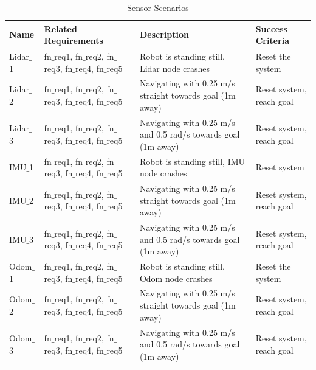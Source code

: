 \begin{table}[ht]
	\caption{Sensor Scenarios}
	\label{tab:sensor_scenarios}
	\begin{tabular}{| m{} | m{}| m{} | m{}|} 
  	\hline
  	\textbf{Name} & \textbf{Related Requirements }& \textbf{Description} & \textbf{Success Criteria}\\ 
  	\hline
  	Lidar$\_$1 & fn$\_$req1, fn$\_$req2, fn$\_$req3, fn$\_$req4, fn$\_$req5 & Robot is standing still, Lidar node crashes & Reset the system\\ 
  	\hline
  	Lidar$\_$2 & fn$\_$req1, fn$\_$req2, fn$\_$req3, fn$\_$req4, fn$\_$req5 & Navigating with 0.25 m/s straight towards goal (1m away) & Reset system, reach goal \\ 
  	\hline
  	Lidar$\_$3 & fn$\_$req1, fn$\_$req2, fn$\_$req3, fn$\_$req4, fn$\_$req5 & Navigating with 0.25 m/s and 0.5 rad/s towards goal (1m away) & Reset system, reach goal\\
  	\hline
  	IMU$\_$1 & fn$\_$req1, fn$\_$req2, fn$\_$req3, fn$\_$req4, fn$\_$req5 & Robot is standing still, IMU node crashes & Reset system \\
  	\hline
  	IMU$\_$2 & fn$\_$req1, fn$\_$req2, fn$\_$req3, fn$\_$req4, fn$\_$req5 & Navigating with 0.25 m/s straight towards goal (1m away) & Reset system, reach goal \\ 
  	\hline
  	IMU$\_$3 & fn$\_$req1, fn$\_$req2, fn$\_$req3, fn$\_$req4, fn$\_$req5 & Navigating with 0.25 m/s and 0.5 rad/s towards goal (1m away) & Reset system, reach goal\\
  	\hline
  	Odom$\_$1 & fn$\_$req1, fn$\_$req2, fn$\_$req3, fn$\_$req4, fn$\_$req5 & Robot is standing still, Odom node crashes & Reset the system\\ 
  	\hline
  	Odom$\_$2 & fn$\_$req1, fn$\_$req2, fn$\_$req3, fn$\_$req4, fn$\_$req5 & Navigating with 0.25 m/s straight towards goal (1m away) & Reset system, reach goal \\ 
  	\hline
  	Odom$\_$3 & fn$\_$req1, fn$\_$req2, fn$\_$req3, fn$\_$req4, fn$\_$req5 & Navigating with 0.25 m/s and 0.5 rad/s towards goal (1m away) & Reset system, reach goal\\
  	\hline
 	\end{tabular}
\end{table} 	
  	

